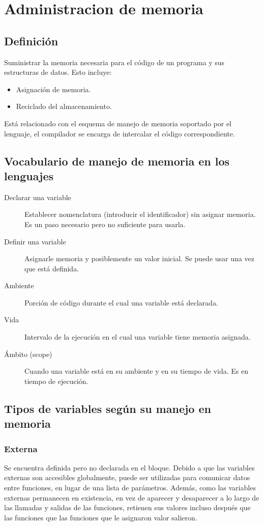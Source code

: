 \documentclass[a4paper, twoside]{article}
\begin{document}
\newpage
\section{Administracion de memoria}
\subsection{Definición}
Suministrar la memoria necesaria para el código de un programa y sus estructuras de datos. Esto incluye:
\begin{itemize}
	\item Asignación de memoria.
	\item Reciclado del almacenamiento.
\end{itemize}

Está relacionado con el esquema de manejo de memoria soportado por el lenguaje, el compilador se encarga de intercalar el código correspondiente.

\subsection{Vocabulario de manejo de memoria en los lenguajes}
\begin{description}
	\item[Declarar una variable] Establecer nomenclatura (introducir el identificador) sin asignar memoria. Es un paso necesario pero no suficiente para usarla.
	
	\item[Definir una variable] Asignarle memoria y posiblemente un valor inicial. Se puede usar una vez que está definida.
	
	\item[Ambiente] Porción de código durante el cual una variable está declarada.
	
	\item[Vida] Intervalo de la ejecución en el cual una variable tiene memoria asignada.
	
	\item[Ámbito (scope)] Cuando una variable está en su ambiente y en su tiempo de vida. Es en tiempo de ejecución.
\end{description}

\subsection{Tipos de variables según su manejo en memoria}
\subsubsection{Externa}
Se encuentra definida pero no declarada en el bloque.
Debido a que las variables externas son accesibles globalmente, puede ser utilizadas para comunicar datos entre funciones, en lugar de una lista de parámetros.
Además, como las variables externas permanecen en existencia, en vez de aparecer y desaparecer a lo largo de las llamadas y salidas de las funciones, retienen sus valores incluso después que las funciones que las funciones que le asignaron valor salieron.
\end{document}
